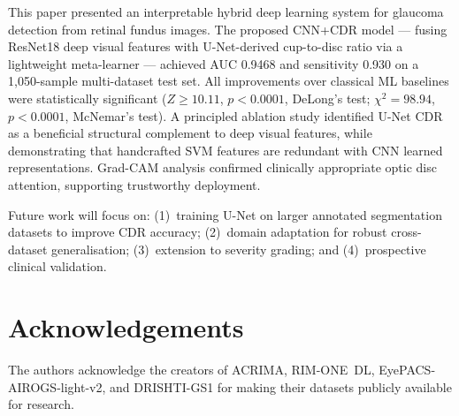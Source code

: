 \documentclass[conference]{IEEEtran}
\begin{document}
This paper presented an interpretable hybrid deep learning system
for glaucoma detection from retinal fundus images. The proposed
CNN+CDR model — fusing ResNet18 deep visual features with
U-Net-derived cup-to-disc ratio via a lightweight meta-learner —
achieved AUC 0.9468 and sensitivity 0.930 on a 1,050-sample
multi-dataset test set. All improvements over classical ML baselines
were statistically significant ($Z\!\geq\!10.11$, $p\!<\!0.0001$,
DeLong's test; $\chi^2\!=\!98.94$, $p\!<\!0.0001$, McNemar's
test). A principled ablation study identified U-Net CDR as a
beneficial structural complement to deep visual features, while
demonstrating that handcrafted SVM features are redundant with CNN
learned representations. Grad-CAM analysis confirmed clinically
appropriate optic disc attention, supporting trustworthy deployment.
 
Future work will focus on: (1)~training U-Net on larger annotated
segmentation datasets to improve CDR accuracy; (2)~domain adaptation
for robust cross-dataset generalisation; (3)~extension to severity
grading; and (4)~prospective clinical validation.
 
\section*{Acknowledgements}
The authors acknowledge the creators of ACRIMA, RIM-ONE~DL,
EyePACS-AIROGS-light-v2, and DRISHTI-GS1 for making their datasets
publicly available for research.
 
\end{document}
